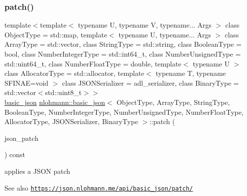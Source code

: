 \subsubsection{\texorpdfstring{patch()}{patch()}}
{\footnotesize\ttfamily template$<$template$<$ typename U, typename V, typename... Args $>$ class Object\+Type = std\+::map, template$<$ typename U, typename... Args $>$ class Array\+Type = std\+::vector, class String\+Type  = std\+::string, class Boolean\+Type  = bool, class Number\+Integer\+Type  = std\+::int64\+\_\+t, class Number\+Unsigned\+Type  = std\+::uint64\+\_\+t, class Number\+Float\+Type  = double, template$<$ typename U $>$ class Allocator\+Type = std\+::allocator, template$<$ typename T, typename S\+F\+I\+N\+A\+E=void $>$ class J\+S\+O\+N\+Serializer = adl\+\_\+serializer, class Binary\+Type  = std\+::vector$<$std\+::uint8\+\_\+t$>$$>$ \\
\hyperlink{classnlohmann_1_1basic__json}{basic\+\_\+json} \hyperlink{classnlohmann_1_1basic__json}{nlohmann\+::basic\+\_\+json}$<$ Object\+Type, Array\+Type, String\+Type, Boolean\+Type, Number\+Integer\+Type, Number\+Unsigned\+Type, Number\+Float\+Type, Allocator\+Type, J\+S\+O\+N\+Serializer, Binary\+Type $>$\+::patch (\begin{DoxyParamCaption}\item[{const \hyperlink{classnlohmann_1_1basic__json}{basic\+\_\+json}$<$ Object\+Type, Array\+Type, String\+Type, Boolean\+Type, Number\+Integer\+Type, Number\+Unsigned\+Type, Number\+Float\+Type, Allocator\+Type, J\+S\+O\+N\+Serializer, Binary\+Type $>$ \&}]{json\+\_\+patch }\end{DoxyParamCaption}) const\hspace{0.3cm}{\ttfamily [inline]}}



applies a J\+S\+ON patch 

\begin{DoxySeeAlso}{See also}
\href{https://json.nlohmann.me/api/basic_json/patch/}{\tt https\+://json.\+nlohmann.\+me/api/basic\+\_\+json/patch/} 
\end{DoxySeeAlso}
\mbox{\label{classnlohmann_1_1basic__json_ab9e0253c92736db021840105d374c4c4}} 
